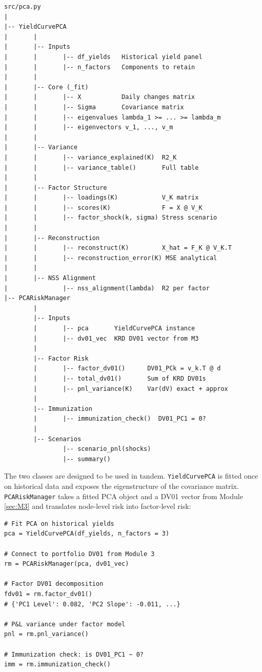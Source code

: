 \documentclass{article}
\theoremstyle{definition}  %
\theoremstyle{plain}  %
\numberwithin{definition}{section}
\numberwithin{proposition}{section}
\numberwithin{theorem}{section}
\numberwithin{equation}{section}
\begin{document}
\begin{verbatim}
src/pca.py
|
|-- YieldCurvePCA
|       |
|       |-- Inputs
|       |       |-- df_yields   Historical yield panel
|       |       |-- n_factors   Components to retain
|       |
|       |-- Core (_fit)
|       |       |-- X           Daily changes matrix
|       |       |-- Sigma       Covariance matrix
|       |       |-- eigenvalues lambda_1 >= ... >= lambda_m
|       |       |-- eigenvectors v_1, ..., v_m
|       |
|       |-- Variance
|       |       |-- variance_explained(K)  R2_K
|       |       |-- variance_table()       Full table
|       |
|       |-- Factor Structure
|       |       |-- loadings(K)            V_K matrix
|       |       |-- scores(K)              F = X @ V_K
|       |       |-- factor_shock(k, sigma) Stress scenario
|       |
|       |-- Reconstruction
|       |       |-- reconstruct(K)         X_hat = F_K @ V_K.T
|       |       |-- reconstruction_error(K) MSE analytical
|       |
|       |-- NSS Alignment
|               |-- nss_alignment(lambda)  R2 per factor
|-- PCARiskManager
        |
        |-- Inputs
        |       |-- pca       YieldCurvePCA instance
        |       |-- dv01_vec  KRD DV01 vector from M3
        |
        |-- Factor Risk
        |       |-- factor_dv01()      DV01_PCk = v_k.T @ d
        |       |-- total_dv01()       Sum of KRD DV01s
        |       |-- pnl_variance(K)    Var(dV) exact + approx
        |
        |-- Immunization
        |       |-- immunization_check()  DV01_PC1 = 0?
        |
        |-- Scenarios
                |-- scenario_pnl(shocks)
                |-- summary()
\end{verbatim}

The two classes are designed to be used in tandem.
\color{codegreen} \texttt{YieldCurvePCA} \color{black} is fitted once on historical data and exposes the eigenstructure of the covariance matrix. \color{codegreen} \texttt{PCARiskManager} \color{black} takes a fitted PCA object and a DV01 vector from Module \ref{sec:M3} and translates node-level risk into factor-level risk:

\begin{lstlisting}[style=Pythonstyle]
# Fit PCA on historical yields
pca = YieldCurvePCA(df_yields, n_factors = 3)

# Connect to portfolio DV01 from Module 3
rm = PCARiskManager(pca, dv01_vec)

# Factor DV01 decomposition
fdv01 = rm.factor_dv01()
# {'PC1 Level': 0.082, 'PC2 Slope': -0.011, ...}

# P&L variance under factor model
pnl = rm.pnl_variance()

# Immunization check: is DV01_PC1 ~ 0?
imm = rm.immunization_check()
\end{lstlisting}
\end{document}
